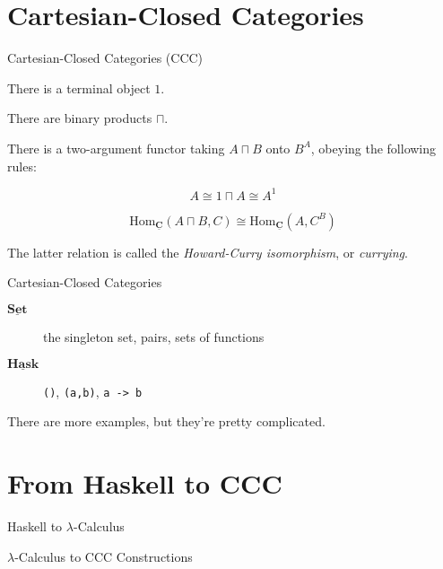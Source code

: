 \documentclass[10pt]{beamer}
\newcommand{\Cat}[1]{\ensuremath{\underline{\mathbf{#1}}}}
\newcommand{\Hom}[3]{\ensuremath{\mathrm{Hom}_{\Cat{#1}}(#2,#3)}}
\newcommand{\Com}[3]{#3^{#2}}
\newcommand{\eqnlabel}[1]{\label{eq:#1}}
\theoremstyle{definition}
\theoremstyle{remark}
\numberwithin{equation}{section}
\begin{document}
\section{Cartesian-Closed Categories}

\begin{frame}[fragile]{Cartesian-Closed Categories (CCC)}

  There is a terminal object $1$.

  There are binary products $\sqcap$.

  There is a two-argument functor taking $A \sqcap B$ onto $\Com{C}{A}{B}$, obeying the following rules:
  
  \[
    A \cong 1 \sqcap A \cong \Com{C}{1}{A}
  \]
  
  \begin{equation}
  \Hom{C}{A\sqcap B}{C} \cong \Hom{C}{A}{\Com{C}{B}{C}} \eqnlabel{exp1}
  \end{equation}

  The latter relation is called the \emph{Howard-Curry isomorphism}, or \emph{currying}.
\end{frame}

\begin{frame}[fragile]{Cartesian-Closed Categories}

  \begin{description}
    \item[\Cat{Set}] the singleton set, pairs, sets of functions
    \item[\Cat{Hask}] \lstinline{()}, \lstinline{(a,b)}, \lstinline{a -> b}
  \end{description}

  There are more examples, but they're pretty complicated.

\end{frame}

\section{From Haskell to CCC} %

\begin{frame}[fragile]{Haskell to $\lambda$-Calculus}
\end{frame}

\begin{frame}[fragile]{$\lambda$-Calculus to CCC Constructions}
\end{frame}

\begin{frame}[fragile]{}
\end{frame}
\end{document}
